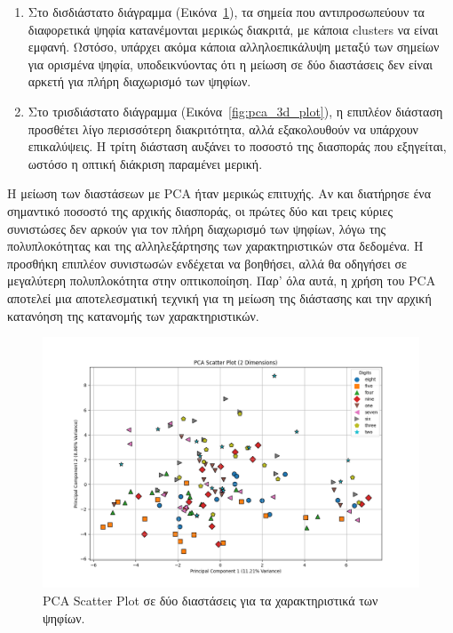\documentclass[a4paper,12pt]{article}
\begin{document}
\begin{enumerate}
    \item Στο δισδιάστατο διάγραμμα (Εικόνα~\ref{fig:pca_2d_plot}), τα σημεία που αντιπροσωπεύουν τα διαφορετικά ψηφία κατανέμονται μερικώς διακριτά, με κάποια clusters να είναι εμφανή. Ωστόσο, υπάρχει ακόμα κάποια αλληλοεπικάλυψη μεταξύ των σημείων για ορισμένα ψηφία, υποδεικνύοντας ότι η μείωση σε δύο διαστάσεις δεν είναι αρκετή για πλήρη διαχωρισμό των ψηφίων.

    \item Στο τρισδιάστατο διάγραμμα (Εικόνα~\ref{fig:pca_3d_plot}), η επιπλέον διάσταση προσθέτει λίγο περισσότερη διακριτότητα, αλλά εξακολουθούν να υπάρχουν επικαλύψεις. Η τρίτη διάσταση αυξάνει το ποσοστό της διασποράς που εξηγείται, ωστόσο η οπτική διάκριση παραμένει μερική.

\end{enumerate}

Η μείωση των διαστάσεων με PCA ήταν μερικώς επιτυχής. Αν και διατήρησε ένα σημαντικό ποσοστό της αρχικής διασποράς, οι πρώτες δύο και τρεις κύριες συνιστώσες δεν αρκούν για τον πλήρη διαχωρισμό των ψηφίων, λόγω της πολυπλοκότητας και της αλληλεξάρτησης των χαρακτηριστικών στα δεδομένα. Η προσθήκη επιπλέον συνιστωσών ενδέχεται να βοηθήσει, αλλά θα οδηγήσει σε μεγαλύτερη πολυπλοκότητα στην οπτικοποίηση. Παρ' όλα αυτά, η χρήση του PCA αποτελεί μια αποτελεσματική τεχνική για τη μείωση της διάστασης και την αρχική κατανόηση της κατανομής των χαρακτηριστικών.

\begin{figure}[h]
    \centering
    \includegraphics[width=\textwidth]{images/pca_2d_plot.png}
    \caption{PCA Scatter Plot σε δύο διαστάσεις για τα χαρακτηριστικά των ψηφίων.}
    \label{fig:pca_2d_plot}
\end{figure}
\end{document}
